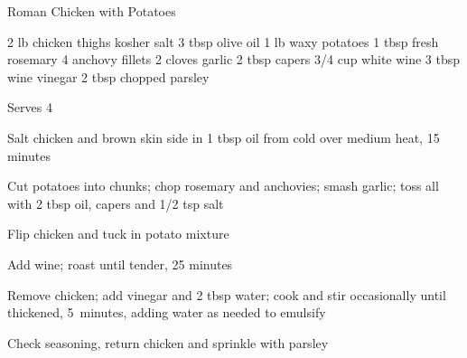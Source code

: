 \begin{denserecipe}{Roman Chicken with Potatoes}{}
\begin{ingredients}
2 lb chicken thighs
kosher salt
3 tbsp olive oil
1 lb waxy potatoes
1 tbsp fresh rosemary
4 anchovy fillets
2 cloves garlic
2 tbsp capers
3/4 cup white wine
3 tbsp wine vinegar
2 tbsp chopped parsley
\end{ingredients}
\nextcolumn
Serves 4
\begin{steps}
    \item Salt chicken and brown skin side in 1 tbsp oil from cold over medium heat, 15 minutes
    \item Cut potatoes into chunks; chop rosemary and anchovies; smash garlic; toss all with 2 tbsp oil, capers and 1/2 tsp salt
    \item Flip chicken and tuck in potato mixture
    \item Add wine; roast until tender, 25 minutes
    \item Remove chicken; add vinegar and 2 tbsp water; cook and stir occasionally until thickened, 5~minutes, adding water as needed to emulsify
    \item Check seasoning, return chicken and sprinkle with parsley
\end{steps}
\end{denserecipe}
